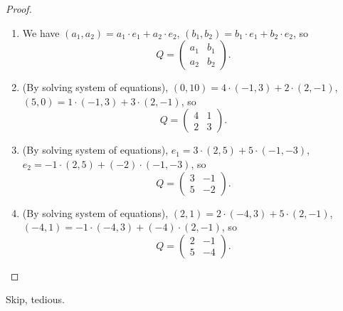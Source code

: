 \begin{proof} \ 

\begin{enumerate}
\item We have \((a_1, a_2) = a_1 \cdot e_1 + a_2 \cdot e_2\), \((b_1, b_2) = b_1 \cdot e_1 + b_2 \cdot e_2\), so
\[ Q = \begin{pmatrix} a_1 & b_1 \\ a_2 & b_2 \end{pmatrix}. \]

\item (By solving system of equations), \((0, 10) = 4 \cdot (-1, 3) + 2 \cdot (2, -1)\), \((5, 0) = 1 \cdot (-1, 3) + 3 \cdot (2, -1)\), so
\[ Q = \begin{pmatrix} 4 & 1 \\ 2 & 3 \end{pmatrix}. \]

\item (By solving system of equations), \(e_1 = 3 \cdot (2, 5) + 5 \cdot (-1, -3)\), \(e_2 = -1 \cdot (2, 5) + (-2) \cdot (-1, -3)\), so
\[ Q = \begin{pmatrix} 3 & -1 \\ 5 & -2 \end{pmatrix}. \]

\item (By solving system of equations), \((2, 1) = 2 \cdot (-4, 3) + 5 \cdot (2, -1)\), \((-4, 1) = -1 \cdot (-4, 3) + (-4) \cdot (2, -1)\), so
\[ Q = \begin{pmatrix} 2 & -1 \\ 5 & -4 \end{pmatrix}. \]
\end{enumerate}
\end{proof}

\begin{exercise} \label{exercise 2.5.3}
Skip, tedious.
\end{exercise}

